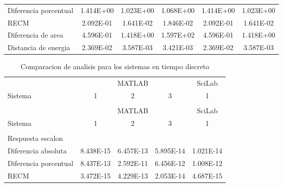 {\begin{longtable}{l @{\extracolsep{\fill}} ccccc}
            Diferencia porcentual  & \num{1.414E+00} & \num{1.023E+00} & \num{1.068E+00} & \num{1.414E+00} & \num{1.023E+00}  \\
            RECM                   & \num{2.092E-01} & \num{1.641E-02} & \num{1.846E-02} & \num{2.092E-01} & \num{1.641E-02}  \\
            Diferencia de area     & \num{4.596E-01} & \num{1.418E+00} & \num{1.597E+02} & \num{4.596E-01} & \num{1.418E+00}  \\
            Distancia de energia   & \num{2.369E-02} & \num{3.587E-03} & \num{3.421E-03} & \num{2.369E-02} & \num{3.587E-03}  \\ 
            \bottomrule
        \end{longtable}}
        
        {\setlength\LTleft{0pt}
        \setlength\LTright{0pt}
        \scriptsize
        \centering
        \renewcommand{\arraystretch}{0.89}
        \begin{longtable}{l @{\extracolsep{\fill}} cccc}
            \caption[Comparacion de analisis - tiempo discreto]{Comparacion de analisis para los sistemas en tiempo discreto}
            \label{tab:AnalisisStepD} \\
            \toprule
                    & \multicolumn{3}{c}{MATLAB} & SciLab   \\ \cmidrule{2-4}\cmidrule{5-5}
            Sistema &   1     &    2     &    3  &   1      \\ \cmidrule{2-2}\cmidrule{3-3}\cmidrule{4-4}\cmidrule{5-5}
            & & & & \\
            \endfirsthead
            \toprule
                    & \multicolumn{3}{c}{MATLAB} & SciLab   \\ \cmidrule{2-4}\cmidrule{5-5}
            Sistema &   1     &    2     &    3  &   1      \\ \cmidrule{2-2}\cmidrule{3-3}\cmidrule{4-4}\cmidrule{5-5}
            & & & & \\
            \endhead
            Respuesta escalon      & & & & \\ \cmidrule{1-1}
            Diferencia absoluta    & \num{8.438E-15} & \num{6.457E-13} & \num{5.895E-14} & \num{1.021E-14}  \\
            Diferencia porcentual  & \num{8.437E-13} & \num{2.592E-11} & \num{6.456E-12} & \num{1.008E-12}  \\
            RECM                   & \num{3.472E-15} & \num{4.229E-13} & \num{2.053E-14} & \num{4.687E-15}  \\

\end{longtable}}
